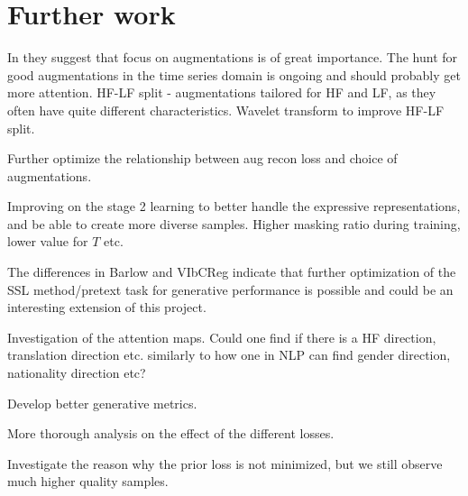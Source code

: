 \documentclass[../../thesis.tex]{subfiles}
\begin{document}
\section{Further work}

In \cite{morningstar2024augmentations} they suggest that focus on augmentations is of great importance. The hunt for good augmentations in the time series domain is ongoing and should probably get more attention.\newline
HF-LF split - augmentations tailored for HF and LF, as they often have quite different characteristics.\newline
Wavelet transform to improve HF-LF split.\newline

Further optimize the relationship between aug recon loss and choice of augmentations.\newline

Improving on the stage 2 learning to better handle the expressive representations, and be able to create more diverse samples. Higher masking ratio during training, lower value for $T$ etc.\newline

The differences in Barlow and VIbCReg indicate that further optimization of the SSL method/pretext task for generative performance is possible and could be an interesting extension of this project. \newline

Investigation of the attention maps. Could one find if there is a HF direction, translation direction etc. similarly to how one in NLP can find gender direction, nationality direction etc?\newline

Develop better generative metrics. \newline

More thorough analysis on the effect of the different losses. \newline

Investigate the reason why the prior loss is not minimized, but we still observe much higher quality samples.
\end{document}

